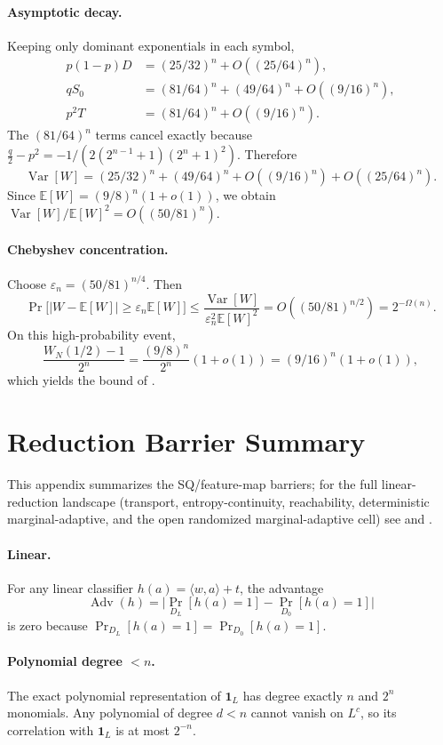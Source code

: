 \documentclass[11pt,a4paper]{article}
\theoremstyle{plain}
\theoremstyle{definition}
\newcommand{\E}{\mathbb{E}}
\DeclareMathOperator{\Adv}{Adv}
\DeclareMathOperator{\Var}{Var}
\begin{document}
\paragraph{Asymptotic decay.}  Keeping only dominant exponentials in each symbol,
\begin{align*}
p(1-p)D &= (25/32)^n + O((25/64)^n), \\
qS_0 &= (81/64)^n + (49/64)^n + O((9/16)^n), \\
p^2T &= (81/64)^n + O((9/16)^n).
\end{align*}
The $(81/64)^n$ terms cancel exactly because $\tfrac{q}{2}-p^2 = -1/(2(2^{n-1}+1)(2^n+1)^2)$.  Therefore
\[
\Var[W] = (25/32)^n + (49/64)^n + O((9/16)^n) + O((25/64)^n).
\]
Since $\E[W] = (9/8)^n(1+o(1))$, we obtain $\Var[W]/\E[W]^2 = O((50/81)^n)$.

\paragraph{Chebyshev concentration.}  Choose $\varepsilon_n = (50/81)^{n/4}$.  Then
\[
\Pr\bigl[|W-\E[W]| \ge \varepsilon_n \E[W]\bigr]
\le \frac{\Var[W]}{\varepsilon_n^2 \E[W]^2}
= O((50/81)^{n/2}) = 2^{-\Omega(n)}.
\]
On this high-probability event,
\[
\frac{W_N(1/2)-1}{2^n} = \frac{(9/8)^n}{2^n}(1+o(1)) = (9/16)^n(1+o(1)),
\]
which yields the bound of .

\section{Reduction Barrier Summary}
\label{app:barrier}

This appendix summarizes the SQ/feature-map barriers; for the full linear-reduction landscape (transport, entropy-continuity, reachability, deterministic marginal-adaptive, and the open randomized marginal-adaptive cell) see  and .

\paragraph{Linear.} For any linear classifier $h(a) = \langle w,a \rangle + t$, the advantage
\[
\Adv(h) = \bigl| \Pr_{D_L}[h(a)=1] - \Pr_{D_0}[h(a)=1] \bigr|
\]
is zero because $\Pr_{D_L}[h(a)=1] = \Pr_{D_0}[h(a)=1]$.

\paragraph{Polynomial degree $<n$.} The exact polynomial representation of $\mathbf{1}_L$ has degree exactly $n$ and $2^n$ monomials. Any polynomial of degree $d < n$ cannot vanish on $L^c$, so its correlation with $\mathbf{1}_L$ is at most $2^{-n}$.
\end{document}
